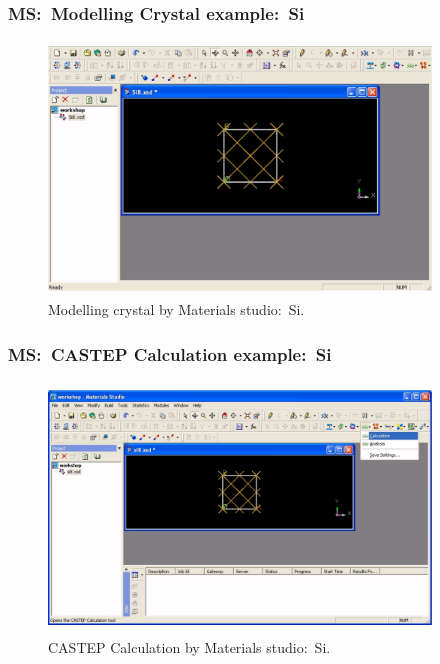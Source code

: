 \frame
{
	\frametitle{\textrm{MS:~Modelling Crystal example:~Si}}
\begin{figure}[h!]
\centering
\vspace*{-0.10in}
\includegraphics[height=2.65in,width=4.00in,viewport=0 0 1090 698,clip]{Figures/MS-New_Project-11-Si_crystal.png}
\caption{\tiny \textrm{Modelling crystal by Materials studio:~Si.}}%
\label{MS-Modelling-Crystal-06}
\end{figure}
}

\frame
{
	\frametitle{\textrm{MS:~CASTEP Calculation example:~Si}}
\begin{figure}[h!]
\centering
\vspace*{-0.10in}
\includegraphics[height=2.62in,width=4.00in,viewport=0 0 1210 740,clip]{Figures/MS-CASTEP-01-Si.png}
\caption{\tiny \textrm{CASTEP Calculation by Materials studio:~Si.}}%
\label{MS-CASTEP-Calculation-01}
\end{figure}
}

